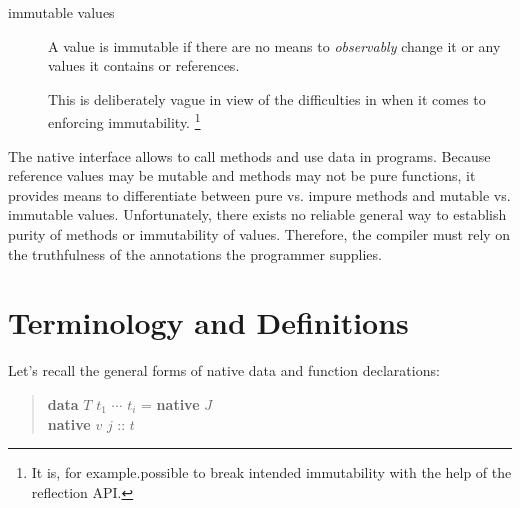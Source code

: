 \begin{description}
\item[immutable values] A value is immutable if there are no means to \emph{observably} change it or any values it contains or references.

This is deliberately vague in view of the difficulties in \java{} when it comes to enforcing immutability. \footnote{It is, for example.possible to break intended immutability with the help of  the reflection API.}
\end{description}

The native interface allows to call \java{} methods and use \java{} data in \frege{} programs.
Because \java{} reference values  may be mutable and \java{} methods may not be pure functions, it provides means to differentiate between pure vs. impure methods and mutable vs. immutable values. Unfortunately, there exists no reliable general way to establish purity of \java{} methods or immutability of \java{} values. Therefore, the \frege{} compiler must rely on the truthfulness of the annotations the programmer supplies.



\section{Terminology and Definitions}

Let's recall the general forms of native data and function declarations:
\begin{quote}
\begin{flushleft}
\textbf{data} $T$ $t_1$ $\cdots$ $t_i$ = \textbf{native} $J$\\
\textbf{native} $v$ $j$ :: $t$
\end{flushleft}
\end{quote}


